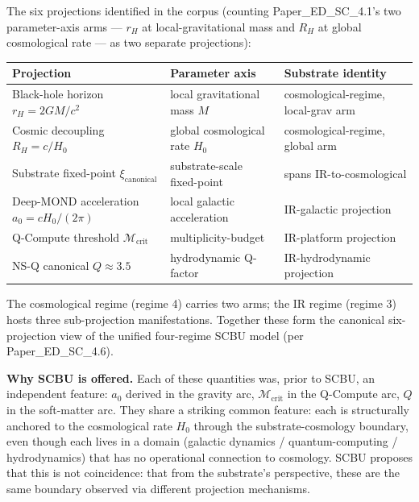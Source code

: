\documentclass[11pt,a4paper]{article}
\begin{document}
The six projections identified in the corpus (counting Paper\_ED\_SC\_4.1's two parameter-axis arms --- $r_H$ at local-gravitational mass and $R_H$ at global cosmological rate --- as two separate projections):

\begin{center}
\footnotesize
\begin{tabular}{p{}p{}p{}}
\toprule
\textbf{Projection} & \textbf{Parameter axis} & \textbf{Substrate identity} \\
\midrule
Black-hole horizon $r_H = 2GM/c^2$ & local gravitational mass $M$ & cosmological-regime, local-grav arm \\
Cosmic decoupling $R_H = c/H_0$ & global cosmological rate $H_0$ & cosmological-regime, global arm \\
Substrate fixed-point $\xi_\mathrm{canonical}$ & substrate-scale fixed-point & spans IR-to-cosmological \\
Deep-MOND acceleration $a_0 = c H_0/(2\pi)$ & local galactic acceleration & IR-galactic projection \\
Q-Compute threshold $\mathcal{M}_\mathrm{crit}$ & multiplicity-budget & IR-platform projection \\
NS-Q canonical $Q \approx 3.5$ & hydrodynamic Q-factor & IR-hydrodynamic projection \\
\bottomrule
\end{tabular}
\end{center}

The cosmological regime (regime 4) carries two arms; the IR regime (regime 3) hosts three sub-projection manifestations. Together these form the canonical six-projection view of the unified four-regime SCBU model (per Paper\_ED\_SC\_4.6).

\textbf{Why SCBU is offered.} Each of these quantities was, prior to SCBU, an independent feature: $a_0$ derived in the gravity arc, $\mathcal{M}_\mathrm{crit}$ in the Q-Compute arc, $Q$ in the soft-matter arc. They share a striking common feature: each is structurally anchored to the cosmological rate $H_0$ through the substrate-cosmology boundary, even though each lives in a domain (galactic dynamics / quantum-computing / hydrodynamics) that has no operational connection to cosmology. SCBU proposes that this is not coincidence: that from the substrate's perspective, these are the same boundary observed via different projection mechanisms.
\end{document}
